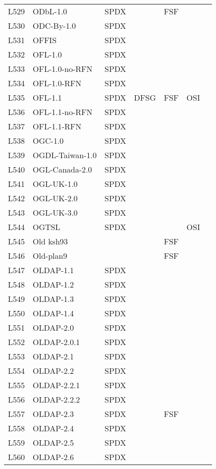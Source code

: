 \begin{longtable}[h]{m{2cm} | m{7cm} | c | c | c | c | c}
  L529 & ODbL-1.0 & SPDX &  & FSF &  &  \\
  L530 & ODC-By-1.0 & SPDX &  &  &  &  \\
  L531 & OFFIS & SPDX &  &  &  &  \\
  L532 & OFL-1.0 & SPDX &  &  &  &  \\
  L533 & OFL-1.0-no-RFN & SPDX &  &  &  &  \\
  L534 & OFL-1.0-RFN & SPDX &  &  &  &  \\
  L535 & OFL-1.1 & SPDX & DFSG & FSF & OSI &  \\
  L536 & OFL-1.1-no-RFN & SPDX &  &  &  &  \\
  L537 & OFL-1.1-RFN & SPDX &  &  &  &  \\
  L538 & OGC-1.0 & SPDX &  &  &  &  \\
  L539 & OGDL-Taiwan-1.0 & SPDX &  &  &  &  \\
  L540 & OGL-Canada-2.0 & SPDX &  &  &  &  \\
  L541 & OGL-UK-1.0 & SPDX &  &  &  &  \\
  L542 & OGL-UK-2.0 & SPDX &  &  &  &  \\
  L543 & OGL-UK-3.0 & SPDX &  &  &  &  \\
  L544 & OGTSL & SPDX &  &  & OSI &  \\
  L545 & Old ksh93 &  &  & FSF &  &  \\
  L546 & Old-plan9 &  &  & FSF &  &  \\
  L547 & OLDAP-1.1 & SPDX &  &  &  &  \\
  L548 & OLDAP-1.2 & SPDX &  &  &  &  \\
  L549 & OLDAP-1.3 & SPDX &  &  &  &  \\
  L550 & OLDAP-1.4 & SPDX &  &  &  &  \\
  L551 & OLDAP-2.0 & SPDX &  &  &  &  \\
  L552 & OLDAP-2.0.1 & SPDX &  &  &  &  \\
  L553 & OLDAP-2.1 & SPDX &  &  &  &  \\
  L554 & OLDAP-2.2 & SPDX &  &  &  &  \\
  L555 & OLDAP-2.2.1 & SPDX &  &  &  &  \\
  L556 & OLDAP-2.2.2 & SPDX &  &  &  &  \\
  L557 & OLDAP-2.3 & SPDX &  & FSF &  &  \\
  L558 & OLDAP-2.4 & SPDX &  &  &  &  \\
  L559 & OLDAP-2.5 & SPDX &  &  &  &  \\
  L560 & OLDAP-2.6 & SPDX &  &  &  &  \\

\end{longtable}
